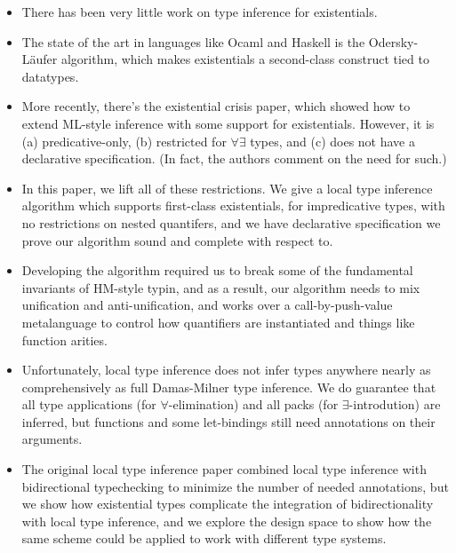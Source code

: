
\begin{itemize}
\item There has been very little work on type inference for existentials. 
\item The state of the art in languages like Ocaml and Haskell is the
  Odersky-L\"{a}ufer algorithm, which makes existentials a
  second-class construct tied to datatypes.
\item More recently, there's the existential crisis paper, which
  showed how to extend ML-style inference with some support for
  existentials. However, it is (a) predicative-only, (b) restricted
  for $\forall\exists$ types, and (c) does not have a declarative
  specification. (In fact, the authors comment on the need for such.)
\item In this paper, we lift all of these restrictions. We give a
  local type inference algorithm which supports first-class
  existentials, for impredicative types, with no restrictions on
  nested quantifers, and we have declarative specification we prove
  our algorithm sound and complete with respect to.
\item Developing the algorithm required us to break some of the
  fundamental invariants of HM-style typin, and as a result, our
  algorithm needs to mix unification and anti-unification, and works
  over a call-by-push-value metalanguage to control how quantifiers
  are instantiated and things like function arities.
\item Unfortunately, local type inference does not infer types anywhere
  nearly as comprehensively as full Damas-Milner type inference. We
  do guarantee that all type applications (for $\forall$-elimination) 
  and all packs (for $\exists$-introdution) are inferred, but functions
  and some let-bindings still need annotations on their arguments.
\item The original local type inference paper combined local type inference
  with bidirectional typechecking to minimize the number of needed
  annotations, but we show how existential types complicate the integration
  of bidirectionality with local type inference, and we explore the design space
  to show how the same scheme could be applied to work with different
  type systems. 
\end{itemize}






